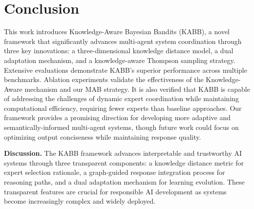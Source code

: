 \section{Conclusion}

This work introduces Knowledge-Aware Bayesian Bandits (KABB), a novel framework that significantly advances multi-agent system coordination through three key innovations: a three-dimensional knowledge distance model, a dual adaptation mechanism, and a knowledge-aware Thompson sampling strategy. Extensive evaluations demonstrate KABB's superior performance across multiple benchmarks. Ablation experiments validate the effectiveness of the Knowledge-Aware mechanism and our MAB strategy. It is also verified that KABB is capable of addressing the challenges of dynamic expert coordination while maintaining computational efficiency, requiring fewer experts than baseline approaches. Our framework provides a promising direction for developing more adaptive and semantically-informed multi-agent systems, though future work could focus on optimizing output conciseness while maintaining response quality.




\textbf{Discussion.} 
The KABB framework advances interpretable and trustworthy AI systems through three transparent components: a knowledge distance metric for expert selection rationale, a graph-guided response integration process for reasoning paths, and a dual adaptation mechanism for learning evolution. These transparent features are crucial for responsible AI development as systems become increasingly complex and widely deployed.


